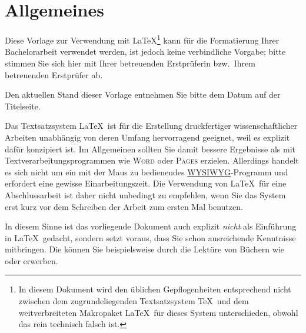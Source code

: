 
\chapter{Allgemeines}


Diese Vorlage zur Verwendung mit \LaTeX\footnote{In diesem Dokument wird den
  üblichen Gepflogenheiten entsprechend nicht zwischen dem zugrundeliegenden
  Textsatzsystem \TeX\ und dem weitverbreiteten Makropaket \LaTeX\ für dieses
  System unterschieden, obwohl das rein technisch falsch ist.} kann für die
Formatierung Ihrer Bachelorarbeit verwendet werden, ist jedoch keine
verbindliche Vorgabe; bitte stimmen Sie sich hier mit Ihrer betreuenden
Erstprüferin bzw.\ Ihrem betreuenden Erstprüfer ab.

Den aktuellen Stand dieser Vorlage entnehmen Sie bitte dem Datum auf der
Titelseite.

Das Textsatzsystem \LaTeX\ ist für die Erstellung druckfertiger
wissenschaftlicher Arbeiten unabhängig von deren Umfang hervorragend geeignet,
weil es explizit dafür konzipiert ist.  Im Allgemeinen sollten Sie damit
bessere Ergebnisse als mit Textverarbeitungsprogrammen wie \textsc{Word} oder
\textsc{Pages} erzielen.  Allerdings handelt es sich nicht um ein mit der Maus
zu bedienendes \href{https://de.wikipedia.org/wiki/WYSIWYG}{WYSIWYG}-Programm
und erfordert eine gewisse Einarbeitungszeit.  Die Verwendung von \LaTeX\ für
eine Abschlussarbeit ist daher nicht unbedingt zu empfehlen, wenn Sie das
System erst kurz vor dem Schreiben der Arbeit zum ersten Mal benutzen.

In diesem Sinne ist das vorliegende Dokument auch explizit \textit{nicht} als
Einführung in \LaTeX\ gedacht, sondern setzt voraus, dass Sie schon
ausreichende Kenntnisse mitbringen.  Die können Sie beispielsweise durch die
Lektüre von Büchern wie
\parencite{voss} oder \parencite{schlosser} erwerben.
